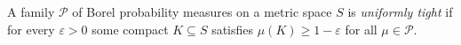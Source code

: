 
A family $\mathcal P$ of Borel probability measures on a metric space $S$ is \emph{uniformly tight} if for every $\varepsilon>0$ some compact $K\subseteq S$ satisfies $\mu(K)\ge1-\varepsilon$ for all $\mu\in\mathcal P$.
